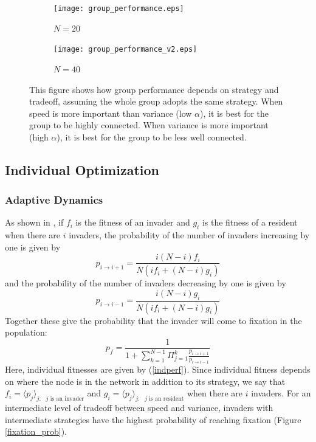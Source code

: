 \documentclass{article}
\begin{document}
\begin{figure}
\begin{subfigure}{\textwidth}
\begin{center}
\texttt{[image: group\_performance.eps]}
\end{center}
\caption{$N=20$}
\end{subfigure}
\begin{subfigure}{\textwidth}
\begin{center}
\texttt{[image: group\_performance\_v2.eps]}
\end{center}
\caption{$N=40$}
\end{subfigure}
\caption{\label{group_performance} This figure shows how group performance depends on strategy and tradeoff, assuming the whole group adopts the same strategy.  When speed is more important than variance (low $\alpha$), it is best for the group to be highly connected.  When variance is more important (high $\alpha$), it is best for the group to be less well connected.}
\end{figure}

\subsection{Individual Optimization }

\subsubsection{Adaptive Dynamics }

As shown in \cite{Nowak:2006uq}, if $f_i$ is the fitness of an invader and $g_i$ is the fitness of a resident when there are $i$ invaders, the probability of the number of invaders increasing by one is given by 
\begin{equation}
p_{i\to i+1}=\frac{i(N-i) f_i}{N(if_i+(N-i)g_i)}\label{probup}
 \end{equation}
and the probability of the number of invaders decreasing by one is given by 
\begin{equation}
p_{i\to i-1}=\frac{i(N-i) g_i}{N(if_i+(N-i)g_i)}\label{probdown}
 \end{equation}
 Together these give the probability that the invader will come to fixation in the population:
 \begin{equation}
 p_f=\frac{1}{1+\sum_{k=1}^{N-1}\Pi_{j=1}^k\frac{p_{i\to i+1}}{p_{i\to i-1}}} \label{probfix}
 \end{equation}
Here, individual fitnesses are given by (\ref{indperf}).  Since individual fitness depends on where the node is in the network in addition to its strategy, we say that $f_i=\langle p_j\rangle_{j: \text{ $j$ is an invader} }$ and $g_i=\langle p_j\rangle_{j: \text{ $j$ is an resident} }$ when there are $i$ invaders.   For an intermediate level of tradeoff between speed and variance, invaders with intermediate strategies have the highest probability of reaching fixation (Figure \ref{fixation_prob}).
 
\end{document}
